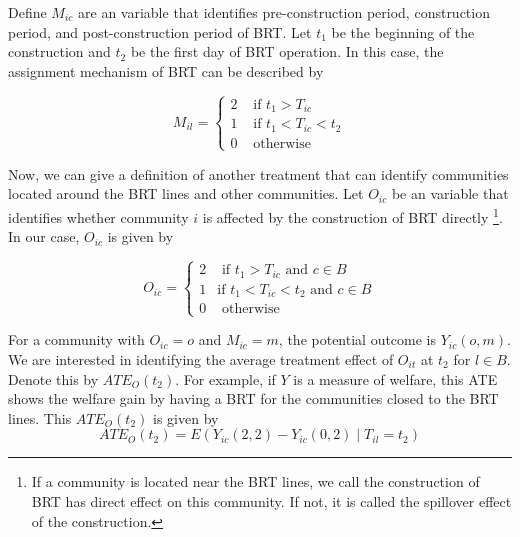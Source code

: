 \documentclass[12pt]{article}
\begin{document}
Define $M_{ic}$ are an variable that identifies pre-construction period, construction period, and post-construction period of BRT. Let $t_1$ be the beginning of the construction and $t_2$ be the first day of BRT operation. In this case, the assignment mechanism of BRT can be described  by 

\begin{equation}
M_{i l}=\left\{\begin{array}{cc}
2 & \text { if } t_1 > T_{i c} \\
1 & \text { if } t_1 < T_{i c} < t_2 \\
0 & \text { otherwise }
\end{array}\right.
\end{equation}


Now, we can give a definition of another treatment that can identify communities located around the BRT lines and other communities. Let $O_{ic}$ be an variable that identifies whether community $i$ is affected by the construction of BRT directly \footnote{If a community is located near the BRT lines, we call the construction of BRT has direct effect on this community. If not, it is called the spillover effect of the construction.}. In our case, $O_{ic}$ is given by 

\begin{equation}
O_{i c}=\left\{\begin{array}{cc}
2 &\text { if } t_1 > T_{i c} \text { and } c \in B \\
1 &\text {if } t_1 < T_{i c}<t_2 \text { and } c \in B \\
0 & \text { otherwise }
\end{array}\right.
\end{equation}

For a community with $O_{i c}=o$ and $M_{i c}=m$, the potential outcome is $Y_{i c}(o, m)$. We are interested in identifying the average treatment effect of $O_{it}$ at $t_2$ for $l \in B$. Denote this by $ATE_O(t_2)$. For example, if $Y$ is a measure of welfare, this ATE shows the welfare gain by having a BRT for the communities closed to the BRT lines. This $ATE_O(t_2)$ is given by
\begin{equation}
A T E_{O}(t_2)=E\left(Y_{i c}(2,2)-Y_{i c}(0,2) \mid T_{i l}=t_2\right)
\end{equation}
\end{document}
